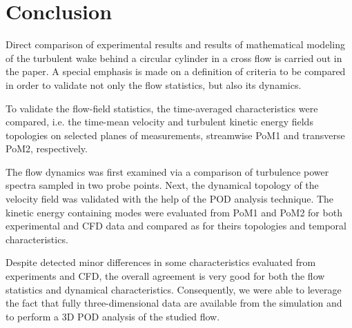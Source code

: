 \section{Conclusion}
\label{sec:concl}
Direct comparison of experimental results and results of mathematical modeling of the turbulent wake behind a circular cylinder {in a cross flow} is carried out in the paper. {A special emphasis is made on a definition of criteria to be compared in order to validate not only the flow statistics, but also its dynamics.}

{To validate the flow-field statistics,} the {time-}averaged characteristics were compared, i.e. {the} time-mean velocity {and turbulent kinetic energy} field{s} topolog{ies} {on selected planes of measurements, streamwise PoM1 and transverse PoM2, respectively.}


{The flow dynamics was first examined via a comparison of turbulence power spectra sampled in two probe points. Next,} the dynamical topology of the velocity field was validated with {the} help of {the} POD analysis technique. The kinetic energy containing modes were evaluated {from PoM1 and PoM2 for} both experimental and CFD data and compared as for theirs topologies {and temporal characteristics}.%

{Despite detected} minor differences in some characteristics evaluated from experiments and CFD, {the} overall agreement is very good for {both the flow} statistics and dynamical characteristics. {Consequently, we were able to leverage the fact that fully three-dimensional data are available from the simulation and to perform a 3D POD analysis of the studied flow.}


